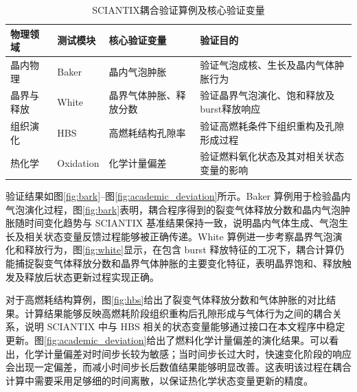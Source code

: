 \begin{table}[htbp]
	\centering
	\caption{SCIANTIX耦合验证算例及核心验证变量}
	\label{tab:verification}

	\begin{tabularx}{\textwidth}{@{}
		>{\centering\arraybackslash}m{2.2cm}
		>{\centering\arraybackslash}m{1.6cm}
		>{\centering\arraybackslash}m{3.3cm}
		>{\centering\arraybackslash}X
		@{}}
		\toprule
		物理领域 & 测试模块                    & 核心验证变量 & 验证目的 \\
		\midrule

		晶内物理
		     & Baker
		     & 晶内气泡肿胀
		     & 验证气泡成核、生长及晶内气体肿胀行为                      \\

		晶界与释放
		     & White
		     & 晶界气体肿胀、释放分数
		     & 验证晶界气泡演化、饱和释放及burst释放响应                 \\

		组织演化
		     & HBS
		     & 高燃耗结构孔隙率
		     & 验证高燃耗条件下组织重构及孔隙形成过程                     \\

		热化学
		     & Oxidation
		     & 化学计量偏差
		     & 验证燃料氧化状态及其对相关状态变量的影响                    \\

		\bottomrule
	\end{tabularx}
\end{table}

验证结果如图\ref{fig:bark}--图\ref{fig:academic_deviation}所示。Baker 算例用于检验晶内气泡演化过程，图\ref{fig:bark}表明，耦合程序得到的裂变气体释放分数和晶内气泡肿胀随时间变化趋势与 SCIANTIX 基准结果保持一致，说明晶内气体生成、气泡生长及相关状态变量反馈过程能够被正确传递。White 算例进一步考察晶界气泡演化和释放行为，图\ref{fig:white}显示，在包含 burst 释放特征的工况下，耦合计算仍能捕捉裂变气体释放分数和晶界气体肿胀的主要变化特征，表明晶界饱和、释放触发及释放后状态更新过程实现正确。

对于高燃耗结构算例，图\ref{fig:hbs}给出了裂变气体释放分数和气体肿胀的对比结果。计算结果能够反映高燃耗阶段组织重构后孔隙形成与气体行为之间的耦合关系，说明 SCIANTIX 中与 HBS 相关的状态变量能够通过接口在本文程序中稳定更新。图\ref{fig:academic_deviation}给出了燃料化学计量偏差的演化结果。可以看出，化学计量偏差对时间步长较为敏感；当时间步长过大时，快速变化阶段的响应会出现一定偏差，而减小时间步长后数值结果能够明显改善。这表明该过程在耦合计算中需要采用足够细的时间离散，以保证热化学状态变量更新的精度。

